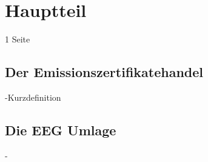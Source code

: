 \chapter{Hauptteil}
1 Seite
\section{Der Emissionszertifikatehandel}
-Kurzdefinition
\section{Die EEG Umlage}
-